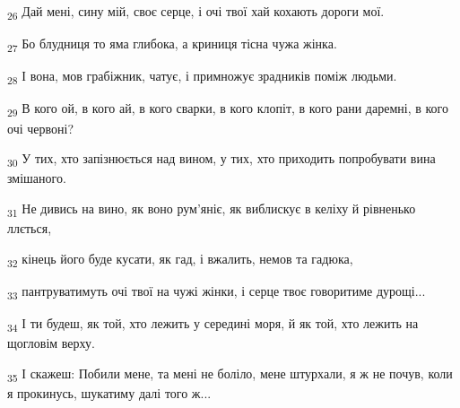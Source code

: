 \begin{tcolorbox}
\textsubscript{26} Дай мені, сину мій, своє серце, і очі твої хай кохають дороги мої.
\end{tcolorbox}
\begin{tcolorbox}
\textsubscript{27} Бо блудниця то яма глибока, а криниця тісна чужа жінка.
\end{tcolorbox}
\begin{tcolorbox}
\textsubscript{28} І вона, мов грабіжник, чатує, і примножує зрадників поміж людьми.
\end{tcolorbox}
\begin{tcolorbox}
\textsubscript{29} В кого ой, в кого ай, в кого сварки, в кого клопіт, в кого рани даремні, в кого очі червоні?
\end{tcolorbox}
\begin{tcolorbox}
\textsubscript{30} У тих, хто запізнюється над вином, у тих, хто приходить попробувати вина змішаного.
\end{tcolorbox}
\begin{tcolorbox}
\textsubscript{31} Не дивись на вино, як воно рум'яніє, як виблискує в келіху й рівненько ллється,
\end{tcolorbox}
\begin{tcolorbox}
\textsubscript{32} кінець його буде кусати, як гад, і вжалить, немов та гадюка,
\end{tcolorbox}
\begin{tcolorbox}
\textsubscript{33} пантруватимуть очі твої на чужі жінки, і серце твоє говоритиме дурощі...
\end{tcolorbox}
\begin{tcolorbox}
\textsubscript{34} І ти будеш, як той, хто лежить у середині моря, й як той, хто лежить на щогловім верху.
\end{tcolorbox}
\begin{tcolorbox}
\textsubscript{35} І скажеш: Побили мене, та мені не боліло, мене штурхали, я ж не почув, коли я прокинусь, шукатиму далі того ж...
\end{tcolorbox}
